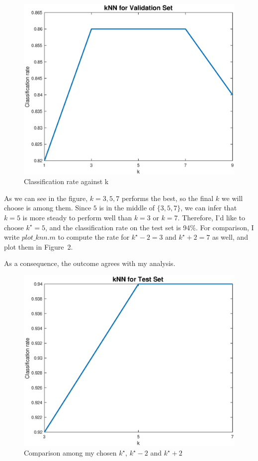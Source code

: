 \documentclass{article}
\begin{document}
\begin{figure}
\centering
\includegraphics[scale=0.4]{1.eps}
\caption{Classification rate against k}
\end{figure}

As we can see in the figure, $k=3,5,7$ performs the best, so the final $k$ we will choose is among them. Since $5$ is in the middle  of $\{3,5,7\}$, we can infer that $k=5$ is more steady to perform well than $k=3$ or $k=7$. Therefore, I'd like to choose $k^\star=5$, and the classification rate on the test set is 94\%. For comparison, I write $plot\_knn.m$ to compute the rate for $k^\star-2=3$ and $k^\star+2=7$ as well, and plot them in Figure~2.

As a consequence, the outcome agrees with my analysis.

\begin{figure}
\centering
\includegraphics[scale=0.4]{2.eps}
\caption{Comparison among my chosen $k^\star$, $k^\star-2$ and $k^\star+2$}
\end{figure}
\end{document}
